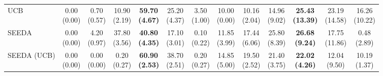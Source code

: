 \begin{table}[H]
{\begin{tabular}{l|cccccc|cccccc}
UCB & \makecell{0.00 \\ (0.00)} & \makecell{0.70 \\ (0.57)} & {\cellcolor[HTML]{C8E6C9}} \makecell{10.90 \\ (2.19)} & \bfseries \makecell{59.70 \\ (4.67)} & \makecell{25.20 \\ (4.37)} & \makecell{3.50 \\ (1.00)} & \makecell{10.00 \\ (0.00)} & \makecell{10.16 \\ (2.04)} & {\cellcolor[HTML]{C8E6C9}} \makecell{14.96 \\ (9.02)} & \bfseries \makecell{25.43 \\ (13.39)} & \makecell{23.19 \\ (14.58)} & \makecell{16.26 \\ (10.22)} \\
SEEDA & \makecell{0.00 \\ (0.00)} & \makecell{4.20 \\ (0.97)} & {\cellcolor[HTML]{C8E6C9}} \makecell{37.80 \\ (3.56)} & \bfseries \makecell{40.80 \\ (4.35)} & \makecell{17.10 \\ (3.01)} & \makecell{0.10 \\ (0.22)} & \makecell{11.85 \\ (3.99)} & \makecell{17.44 \\ (6.06)} & {\cellcolor[HTML]{C8E6C9}} \makecell{25.80 \\ (8.39)} & \bfseries \makecell{26.68 \\ (9.24)} & \makecell{17.75 \\ (11.86)} & \makecell{0.48 \\ (2.89)} \\
SEEDA (UCB) & \makecell{0.00 \\ (0.00)} & \makecell{0.00 \\ (0.00)} & {\cellcolor[HTML]{C8E6C9}} \makecell{0.20 \\ (0.27)} & \bfseries \makecell{60.90 \\ (2.53)} & \makecell{38.70 \\ (2.51)} & \makecell{0.20 \\ (0.27)} & \makecell{14.85 \\ (5.00)} & \makecell{19.50 \\ (2.52)} & {\cellcolor[HTML]{C8E6C9}} \makecell{21.40 \\ (3.75)} & \bfseries \makecell{22.02 \\ (4.26)} & \makecell{12.04 \\ (9.50)} & \makecell{10.19 \\ (1.37)} \\

\end{tabular}}
\end{table}
